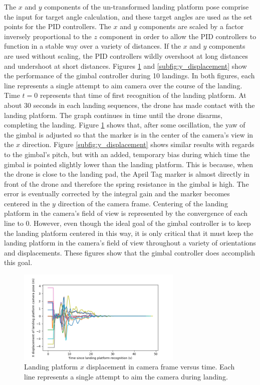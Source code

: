 The $x$ and $y$ components of the un-transformed landing platform pose comprise the input for target angle calculation, and these target angles are used as the set points for the PID controllers. The $x$ and $y$ components are scaled by a factor inversely proportional to the $z$ component in order to allow the PID controllers to function in a stable way over a variety of distances. If the $x$ and $y$ components are used without scaling, the PID controllers wildly overshoot at long distances and undershoot at short distances. Figures \ref{subfig:x_displacement} and \ref{subfig:y_displacement} show the performance of the gimbal controller during 10 landings. In both figures, each line represents a single attempt to aim camera over the course of the landing. Time $t=0$ represents that time of first recognition of the landing platform. At about 30 seconds in each landing sequences, the drone has made contact with the landing platform. The graph continues in time until the drone disarms, completing the landing. Figure \ref{subfig:x_displacement} shows that, after some oscillation, the yaw of the gimbal is adjusted so that the marker is in the center of the camera's view in the $x$ direction. Figure \ref{subfig:y_displacement} shows similar results with regards to the gimbal's pitch, but with an added, temporary bias during which time the gimbal is pointed slightly lower than the landing platform. This is because, when the drone is close to the landing pad, the April Tag marker is almost directly in front of the drone and therefore the spring resistance in the gimbal is high. The error is eventually corrected by the integral gain and the marker becomes centered in the $y$ direction of the camera frame. Centering of the landing platform in the camera's field of view is represented by the convergence of each line to 0. However, even though the ideal goal of the gimbal controller is to keep the landing platform centered in this way, it is only critical that it must keep the landing platform in the camera's field of view throughout a variety of orientations and displacements. These figures show that the gimbal controller does accomplish this goal.

\begin{figure}[ht]
    \centering
    \includegraphics[width=0.7\textwidth]{images/x_displacement.png}
    \caption[Landing platform $x$ displacement in camera frame versus time.]{Landing platform $x$ displacement in camera frame versus time. Each line represents a single attempt to aim the camera during landing.}
    \label{subfig:x_displacement}
\end{figure}

